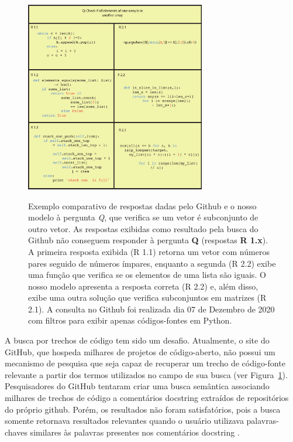 \begin{figure}[H]
\centering
\caption[Exemplo]{Exemplo comparativo de respostas dadas pelo Github e o nosso modelo à pergunta \emph{Q}, que verifica se um vetor é subconjunto de outro vetor. As respostas exibidas como resultado pela busca do Github não conseguem responder à pergunta \textbf{Q} (respostas \textbf{R 1.x}). A primeira resposta exibida (R 1.1) retorna um vetor com números pares seguido de números ímpares, enquanto a segunda (R 2.2) exibe uma função que verifica se os elementos de uma lista são iguais. O nosso modelo apresenta a resposta correta (R 2.2) e, além disso, exibe uma outra solução que verifica subconjuntos em matrizes (R 2.1). A consulta no Github foi realizada dia 07 de Dezembro de 2020 com filtros para exibir apenas códigos-fontes em Python.}
\includegraphics[width=0.7\textwidth]{figuras/cap-introducao/concrete_examples.pdf}
\label{fig:concrete-example}
\end{figure}

A busca por trechos de código tem sido um desafio. Atualmente, o site do GitHub, que hospeda milhares de projetos de código-aberto, não possui um mecanismo de pesquisa que
seja capaz de recuperar um trecho de código-fonte relevante a partir dos termos utilizados no campo de sua busca (ver Figura~\ref{fig:concrete-example}). Pesquisadores do GitHub tentaram criar uma busca semântica associando milhares de trechos de código a comentários \gls{docstring} extraídos de repositórios do próprio \Gls{github}. Porém, os resultados não foram satisfatórios, pois a busca somente retornava resultados relevantes quando o usuário utilizava palavras-chaves similares às palavras presentes nos comentários \gls{docstring} \cite{husain-github-semantic-search-code-2019}. 

